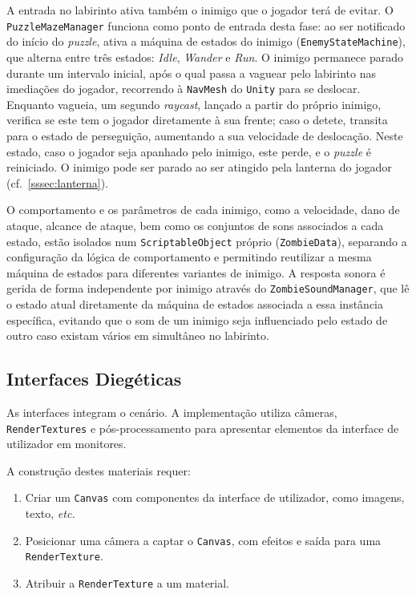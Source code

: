 \documentclass[a4paper, 12pt]{book}
\begin{document}
A entrada no labirinto ativa também o inimigo que o jogador terá de 
evitar. O \texttt{PuzzleMazeManager} funciona como ponto de entrada desta 
fase: ao ser notificado do início do \textit{puzzle}, ativa a máquina de estados do 
inimigo (\texttt{EnemyStateMachine}), que alterna entre três estados: 
\textit{Idle}, \textit{Wander} e \textit{Run}. O inimigo permanece parado 
durante um intervalo inicial, após o qual passa a vaguear pelo labirinto nas 
imediações do jogador, recorrendo à \texttt{NavMesh} do \texttt{Unity} para se 
deslocar. Enquanto vagueia, um segundo \textit{raycast}, lançado a partir do 
próprio inimigo, verifica se este tem o jogador diretamente à sua frente; 
caso o detete, transita para o estado de perseguição, aumentando a sua 
velocidade de deslocação. Neste estado, caso o jogador seja apanhado 
pelo inimigo, este perde, e o \textit{puzzle} é reiniciado. O inimigo
pode ser parado ao ser atingido pela lanterna do jogador (cf.~\ref{sssec:lanterna}).

O comportamento e os parâmetros de cada inimigo, como a velocidade, dano de 
ataque, alcance de ataque, bem como os conjuntos de sons 
associados a cada estado, estão isolados num \texttt{ScriptableObject} 
próprio (\texttt{ZombieData}), separando a configuração da lógica de 
comportamento e permitindo reutilizar a mesma máquina de estados para 
diferentes variantes de inimigo. A resposta sonora é gerida de forma 
independente por inimigo através do \texttt{ZombieSoundManager}, que lê o 
estado atual diretamente da máquina de estados associada a essa instância 
específica, evitando que o som de um inimigo seja influenciado pelo estado 
de outro caso existam vários em simultâneo no labirinto.

\subsection{Interfaces Diegéticas}\label{ssec:interfaces}

As interfaces integram o cenário. A implementação utiliza câmeras,
\texttt{RenderTextures} e pós-processamento para apresentar elementos da
interface de utilizador em monitores.

A construção destes materiais requer:
\begin{enumerate}
    \item Criar um \texttt{Canvas} com componentes da interface de utilizador, como imagens, texto, \textit{etc.}
    \item Posicionar uma câmera a captar o \texttt{Canvas}, com efeitos e saída para uma \texttt{RenderTexture}.
    \item Atribuir a \texttt{RenderTexture} a um material.
\end{enumerate}
\end{document}
